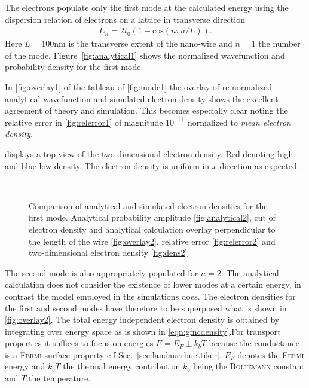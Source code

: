 The electrons populate only the first mode at the calculated energy using the dispersion relation of electrons on a lattice in transverse direction
\begin{align}
E_{n} = 2t_0(1-\text{cos}(n\pi a/L)).
\label{eqn:dispersionlattice}
\end{align}
Here $L=100$nm is the transverse extent of the nano-wire and $n=1$ the number of the mode. Figure~\ref{fig:analytical1} shows the normalized wavefunction and probability density for the first mode.\par
In \cref{fig:overlay1} of the tableau of \cref{fig:mode1} the overlay of re-normalized analytical wavefunction and simulated electron density shows the excellent agreement of theory and simulation. This becomes especially clear noting the relative error in \cref{fig:relerror1} of magnitude $10^{-11}$ normalized to \emph{mean electron density}.\par
{} displays a top view of the two-dimensional electron density. Red denoting high and blue low density. The electron density is uniform in $x$ direction as expected.\par
\begin{figure}[h]
  \begin{center}
 \qquad
    \\
    \qquad
    \caption{Comparison of analytical and simulated electron densities for the first mode. Analytical probability amplitude \ref{fig:analytical2}, cut of electron density and analytical calculation overlay perpendicular to the length of the wire \ref{fig:overlay2}, relative error \ref{fig:relerror2} and two-dimensional electron density \ref{fig:dens2}}\label{fig:mode2}
  \end{center}
\end{figure}
The second mode is also appropriately populated for $n=2$. The analytical calculation does not consider the existence of lower modes at a certain energy, in contrast the model employed in the simulations does. The electron densities for the first and second modes have therefore to be superposed what is shown in \cref{fig:overlay2}. The total energy independent electron density is obtained by integrating over energy space as is shown in \cref{eqn:gfncdensity}.For transport properties it suffices to focus on energies $E=E_F\pm k_bT$ because the conductance is a \textsc{Fermi} surface property c.f Sec.~\ref{sec:landauerbuettiker}. $E_F$ denotes the \textsc{Fermi} energy and $k_bT$ the thermal energy contribution $k_b$ being the \textsc{Boltzmann} constant and $T$ the temperature.\par
